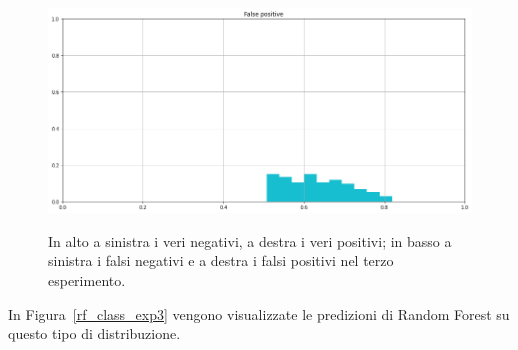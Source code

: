 \documentclass[12pt]{report}
\theoremstyle{definition}
\begin{document}
\begin{figure}
   \begin{minipage}{0.48\textwidth}
     \includegraphics[width=\linewidth]{images/experiment_beta05_disgiunti/fp.png}\label{fp_b05d}
   \end{minipage}
   \caption{In alto a sinistra i veri negativi, a destra i veri positivi; in basso a sinistra i falsi negativi e a destra i falsi positivi nel terzo esperimento.}
   \label{4cases_exp3}
\end{figure}
In Figura~\ref{rf_class_exp3} vengono visualizzate le predizioni di Random Forest su questo tipo di distribuzione.
\end{document}
